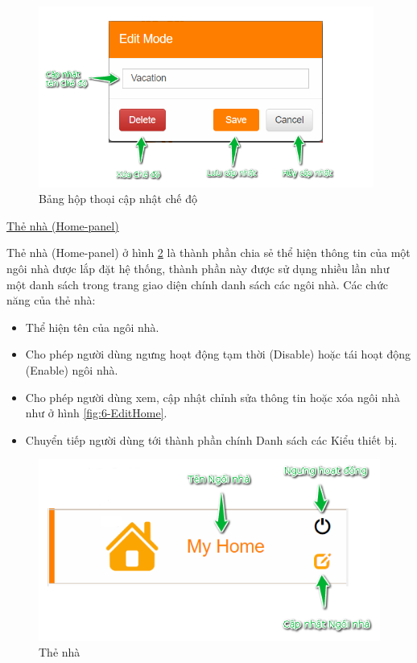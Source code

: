 \documentclass[12pt,a4paper,oneside]{extbook}
\begin{document}
\begin{figure}[h!]
  \centering
     \includegraphics[width=11cm]{6-EditMode}
  \caption{Bảng hộp thoại cập nhật chế độ}\label{fig:6-EditMode}
\end{figure}

\noindent
\underline{Thẻ nhà (Home-panel)}

\noindent
Thẻ nhà (Home-panel) ở hình \ref{fig:6-home-panel} là thành phần chia sẻ thể hiện thông tin của một ngôi nhà được lắp đặt hệ thống, thành phần này được sử dụng nhiều lần như một danh sách trong trang giao diện chính danh sách các ngôi nhà. Các chức năng của thẻ nhà:

\begin{itemize}[topsep=1mm,itemsep=-0.5mm]
\item Thể hiện tên của ngôi nhà.
\item Cho phép người dùng ngưng hoạt động tạm thời (Disable) hoặc tái hoạt động (Enable) ngôi nhà.
\item Cho phép người dùng xem, cập nhật chỉnh sửa thông tin hoặc xóa ngôi nhà như ở hình \ref{fig:6-EditHome}.
\item Chuyển tiếp người dùng tới thành phần chính Danh sách các Kiểu thiết bị.
\vspace{1mm}
\end{itemize}

\begin{figure}[h]
  \centering
     \includegraphics[width=12cm]{6-home-panel}
  \caption{Thẻ nhà}\label{fig:6-home-panel}
\end{figure}
\end{document}
